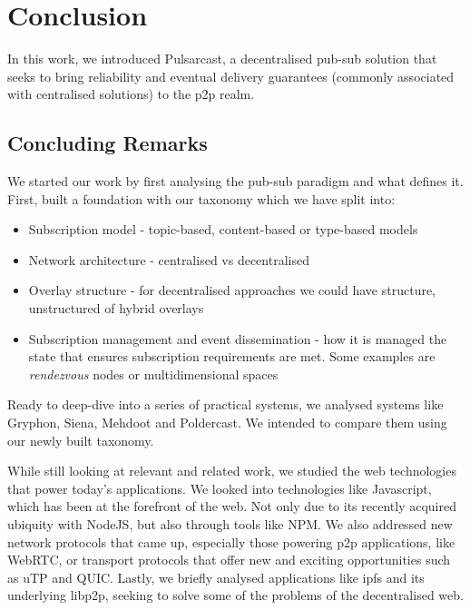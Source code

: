 
\chapter{Conclusion}
\label{chapter:conclusion}

In this work, we introduced Pulsarcast, a decentralised pub-sub solution that
seeks to bring reliability and eventual delivery guarantees (commonly
associated with centralised solutions) to the \acrshort{p2p} realm.

\section{Concluding Remarks}\label{remarks}

We started our work by first analysing the pub-sub paradigm and what defines
it. First, built a foundation with our taxonomy which we have split into:

\begin{itemize}
  \item
    Subscription model - topic-based, content-based or type-based models
  \item
    Network architecture - centralised vs decentralised
  \item
    Overlay structure - for decentralised approaches we could have structure,
    unstructured of hybrid overlays
  \item
    Subscription management and event dissemination - how it is managed the state that ensures subscription requirements are met. Some examples are \emph{rendezvous} nodes or multidimensional spaces
\end{itemize}

Ready to deep-dive into a series of practical systems, we analysed systems like
Gryphon, Siena, Mehdoot and Poldercast. We intended to compare them using our
newly built taxonomy.

While still looking at relevant and related work, we studied the web
technologies that power today's applications. We looked into technologies like
Javascript, which has been at the forefront of the web. Not only due to its
recently acquired ubiquity with NodeJS, but also through tools like NPM. We
also addressed new network protocols that came up, especially those powering
\acrshort{p2p} applications, like WebRTC, or transport protocols that offer new
and exciting opportunities such as uTP and QUIC. Lastly, we briefly analysed
applications like \acrshort{ipfs} and its underlying libp2p, seeking to solve
some of the problems of the decentralised web.


